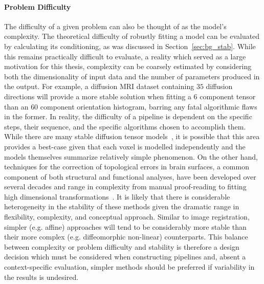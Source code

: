 \paragraph{Problem Difficulty}
The difficulty of a given problem can also be thought of as the model's complexity. The theoretical difficulty of
robustly fitting a model can be evaluated by calculating its conditioning, as was discussed in
Section~\ref{sec:bg_stab}. While this remains practically difficult to evaluate, a reality which served as a large
motivation for this thesis, complexity can be coarsely estimated by considering both the dimensionality of input
data and the number of parameters produced in the output. For example, a diffusion MRI dataset containing $35$
diffusion directions will provide a more stable solution when fitting a $6$ component tensor than an $60$ component
orientation histogram, barring any fatal algorithmic flaws in the former. In reality, the difficulty of a pipeline
is dependent on the specific steps, their sequence, and the specific algorithms chosen to accomplish them. While
there are many stable diffusion tensor models~\cite{skare2000condition}, it is possible that this area provides a
best-case given that each voxel is modelled independently and the models themselves summarize relatively simple
phenomenon. On the other hand, techniques for the correction of topological errors in brain surfaces, a common
component of both structural and functional analyses, have been developed over several decades and range in
complexity from manual proof-reading to fitting high dimensional transformations~\cite{yotter2011topological}. It
is likely that there is considerable heterogeneity in the stability of these methods given the dramatic range in
flexibility, complexity, and conceptual approach. Similar to image registration, simpler (e.g. affine) approaches
will tend to be considerably more stable than their more complex (e.g. diffeomorphic non-linear) counterparts.
This balance between complexity or problem difficulty and stability is therefore a design decision which must be
considered when constructing pipelines and, absent a context-specific evaluation, simpler methods should be
preferred if variability in the results is undesired.


